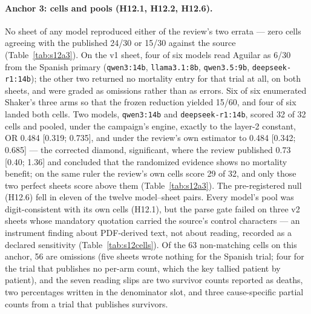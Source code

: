 \documentclass[11pt]{article}
\begin{document}
\paragraph{Anchor 3: cells and pools (H12.1, H12.2, H12.6).} No sheet of any model reproduced either of the review's two errata --- zero cells agreeing with the published 24/30 or 15/30 against the source (Table~\ref{tab:s12a3}). On the v1 sheet, four of six models read Aguilar as 6/30 from the Spanish primary (\texttt{qwen3:14b}, \texttt{llama3.1:8b}, \texttt{qwen3.5:9b}, \texttt{deepseek-r1:14b}); the other two returned no mortality entry for that trial at all, on both sheets, and were graded as omissions rather than as errors. Six of six enumerated Shaker's three arms so that the frozen reduction yielded 15/60, and four of six landed both cells. Two models, \texttt{qwen3:14b} and \texttt{deepseek-r1:14b}, scored 32 of 32 cells and pooled, under the campaign's engine, exactly to the layer-2 constant, OR 0.484 [0.319; 0.735], and under the review's own estimator to 0.484 [0.342; 0.685] --- the corrected diamond, significant, where the review published 0.73 [0.40; 1.36] and concluded that the randomized evidence shows no mortality benefit; on the same ruler the review's own cells score 29 of 32, and only those two perfect sheets score above them (Table~\ref{tab:s12a3}). The pre-registered null (H12.6) fell in eleven of the twelve model--sheet pairs. Every model's pool was digit-consistent with its own cells (H12.1), but the parse gate failed on three v2 sheets whose mandatory quotation carried the source's control characters --- an instrument finding about PDF-derived text, not about reading, recorded as a declared sensitivity (Table~\ref{tab:s12cells}). Of the 63 non-matching cells on this anchor, 56 are omissions (five sheets wrote nothing for the Spanish trial; four for the trial that publishes no per-arm count, which the key tallied patient by patient), and the seven reading slips are two survivor counts reported as deaths, two percentages written in the denominator slot, and three cause-specific partial counts from a trial that publishes survivors.
\end{document}
